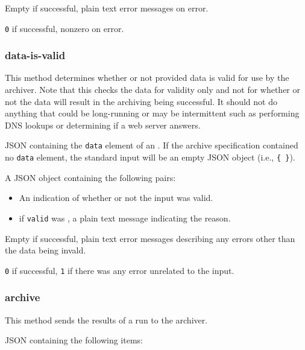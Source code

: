\documentclass[10pt,titlepage]{article}
\begin{document}
 Empty if successful, plain text error
messages on error.

 {\tt 0} if successful, nonzero on error.



\subsubsection{data-is-valid}

This method determines whether or not provided data is valid for use
by the archiver.  Note that this checks the data for validity only and
not for whether or not the data will result in the archiving being
successful.  It should not do anything that could be long-running or
may be intermittent such as performing DNS lookups or determining if a
web server answers.

 JSON containing the {\tt data} element of
an .  If the archive specification
contained no {\tt data} element, the standard input will be an empty
JSON object (i.e., {\tt \{ \}}).

 A JSON object containing the following pairs:

\begin{itemize}
\item {} An indication of whether or not the
  input was valid.

\item {} if {\tt valid} was \false, a plain
  text message indicating the reason.
\end{itemize}


 Empty if successful, plain text error
messages describing any errors other than the data being invald.

 {\tt 0} if successful, {\tt 1} if there was
any error unrelated to the input.


\subsubsection{archive}

This method sends the results of a run to the archiver.

 JSON containing the following items:
\end{document}
